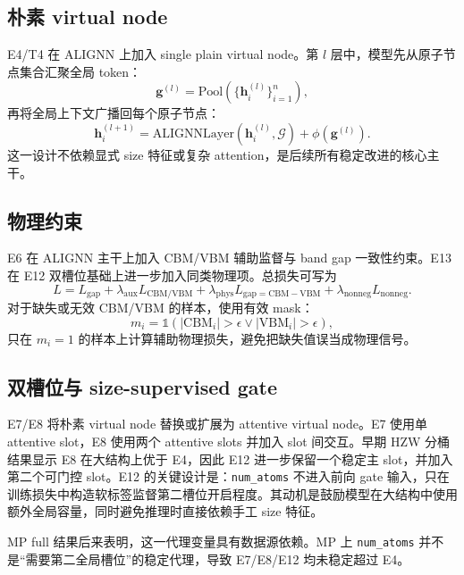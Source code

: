 \documentclass[UTF8,a4paper,11pt]{ctexart}
\begin{document}
\subsection{朴素 virtual node}

E4/T4 在 ALIGNN 上加入 single plain virtual node。第 $l$ 层中，模型先从原子节点集合汇聚全局 token：
\begin{equation}
\mathbf{g}^{(l)}=\mathrm{Pool}\left(\{\mathbf{h}_i^{(l)}\}_{i=1}^{n}\right),
\end{equation}
再将全局上下文广播回每个原子节点：
\begin{equation}
\mathbf{h}_i^{(l+1)}
= \mathrm{ALIGNNLayer}(\mathbf{h}_i^{(l)},\mathcal{G})
+ \phi(\mathbf{g}^{(l)}).
\end{equation}
这一设计不依赖显式 size 特征或复杂 attention，是后续所有稳定改进的核心主干。

\subsection{物理约束}

E6 在 ALIGNN 主干上加入 CBM/VBM 辅助监督与 band gap 一致性约束。E13 在 E12 双槽位基础上进一步加入同类物理项。总损失可写为
\begin{equation}
L = L_{\mathrm{gap}} + \lambda_{\mathrm{aux}}L_{\mathrm{CBM/VBM}}
+ \lambda_{\mathrm{phys}}L_{\mathrm{gap=CBM-VBM}}
+ \lambda_{\mathrm{nonneg}}L_{\mathrm{nonneg}}.
\end{equation}
对于缺失或无效 CBM/VBM 的样本，使用有效 mask：
\begin{equation}
m_i = \mathbb{1}\left(|\mathrm{CBM}_i|>\epsilon \lor |\mathrm{VBM}_i|>\epsilon\right),
\end{equation}
只在 $m_i=1$ 的样本上计算辅助物理损失，避免把缺失值误当成物理信号。

\subsection{双槽位与 size-supervised gate}

E7/E8 将朴素 virtual node 替换或扩展为 attentive virtual node。E7 使用单 attentive slot，E8 使用两个 attentive slots 并加入 slot 间交互。早期 HZW 分桶结果显示 E8 在大结构上优于 E4，因此 E12 进一步保留一个稳定主 slot，并加入第二个可门控 slot。E12 的关键设计是：\texttt{num\_atoms} 不进入前向 gate 输入，只在训练损失中构造软标签监督第二槽位开启程度。其动机是鼓励模型在大结构中使用额外全局容量，同时避免推理时直接依赖手工 size 特征。

MP full 结果后来表明，这一代理变量具有数据源依赖。MP 上 \texttt{num\_atoms} 并不是“需要第二全局槽位”的稳定代理，导致 E7/E8/E12 均未稳定超过 E4。
\end{document}
